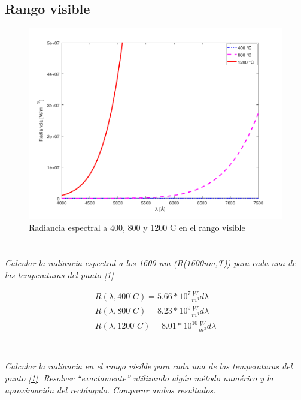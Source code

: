 \documentclass[10pt,a4paper]{article}
\begin{document}
		\subsection{Rango visible}
			\begin{figure}[H]
					\centering\includegraphics[scale=1]{images/visible.pdf}\caption{Radiancia espectral a 400, 800 y 1200 \textdegree C en el rango visible}
			\end{figure}

	\section{}
		\textit{
		Calcular la radiancia espectral a los 1600 nm (R(1600nm,T)) para cada una de las
		temperaturas del punto \ref{1}
		}

		\begin{align*}
			R(\lambda, 400 ^{\circ}C) = 5.66 * 10^7 \frac{W}{m^3} d\lambda \\
			R(\lambda, 800 ^{\circ}C) = 8.23 * 10^9 \frac{W}{m^3} d\lambda \\
			R(\lambda, 1200 ^{\circ}C) = 8.01 * 10^{10} \frac{W}{m^3} d\lambda \\
		\end{align*}

	\section{}
		\textit{Calcular la radiancia en el rango visible para cada una de las temperaturas del punto
		\ref{1}. Resolver “exactamente” utilizando algún método numérico y la aproximación del
		rectángulo. Comparar ambos resultados.
		}
		\\
\end{document}
